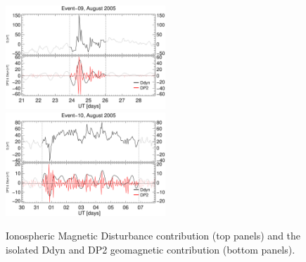 \documentclass[a4paper,fleqn]{cas-dc}
\begin{document}
\begin{figure}[h!]
       \centerline{\Large \bf   
      \hspace{0.275\textwidth}  \color{black}{}
       \hspace{0.295\textwidth}  \color{black}{}
         \hfill}
       \includegraphics[width=6.0cm]{images/diono/iono_PI_V1_2005-08-21.eps}     
       \includegraphics[width=6.0cm]{images/diono/iono_PI_V1_2005-08-30.eps}
       
       \caption{Ionospheric Magnetic Disturbance contribution (top panels) and the isolated Ddyn and DP2 geomagnetic contribution (bottom panels).}
    \label{fig:iono_resp2}
\end{figure}
\end{document}
